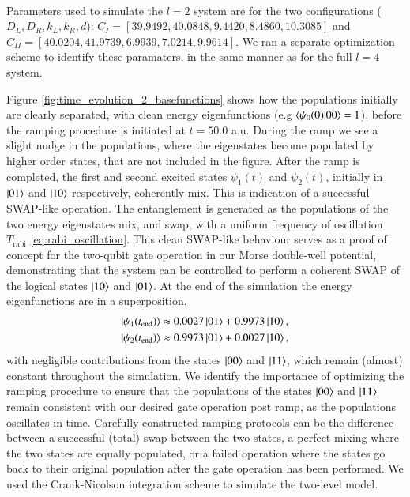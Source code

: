 \documentclass{subfiles}
\begin{document}
\\ 
Parameters used to simulate the $l=2$ system are for the two configurations ($D_L, D_R, k_L, k_R, d$): $C_I = [39.9492, 40.0848, 9.4420, 8.4860, 10.3085]$ and $C_{II} = [40.0204, 41.9739, 6.9939, 7.0214, 9.9614]$. We ran a separate optimization scheme to identify these paramaters, in the same manner as for the full $l=4$ system.

Figure \ref{fig:time_evolution_2_basefunctions} shows how the populations initially are clearly separated, with clean energy eigenfunctions (e.g $\braket{\psi_0(0)|00} = 1$), before the ramping procedure is initiated at $t = 50.0$ a.u. During the ramp we see a slight nudge in the populations, where the eigenstates become populated by higher order states, that are not included in the figure. After the ramp is completed, the first and second excited states $\psi_1(t)$ and $\psi_2(t)$, initially in $\ket{01}$ and $\ket{10}$ respectively, coherently mix. This is indication of a successful SWAP-like operation. The entanglement is generated as the populations of the two energy eigenstates mix, and swap, with a uniform frequency of oscillation $T_{\text{rabi}}$ \eqref{eq:rabi_oscillation}. This clean SWAP-like behaviour serves as a proof of concept for the two-qubit gate operation in our Morse double-well potential, demonstrating that the system can be controlled to perform a coherent SWAP of the logical states $\ket{10}$ and $\ket{01}$. At the end of the simulation the energy eigenfunctions are in a superposition, 
\begin{align*}
    \ket{\psi_1(t_{\text{end}})} &\approx 0.0027 \ket{01} + 0.9973 \ket{10}, \\
    \ket{\psi_2(t_{\text{end}})} &\approx 0.9973 \ket{01} + 0.0027 \ket{10},
\end{align*}
with negligible contributions from the states $\ket{00}$ and $\ket{11}$, which remain (almost) constant throughout the simulation. We identify the importance of optimizing the ramping procedure to ensure that the populations of the states $\ket{00}$ and $\ket{11}$ remain consistent with our desired gate operation post ramp, as the populations oscillates in time. Carefully constructed ramping protocols can be the difference between a successful (total) swap between the two states, a perfect mixing where the two states are equally populated, or a failed operation where the states go back to their original population after the gate operation has been performed. We used the Crank-Nicolson integration scheme to simulate the two-level model. \\
\end{document}
